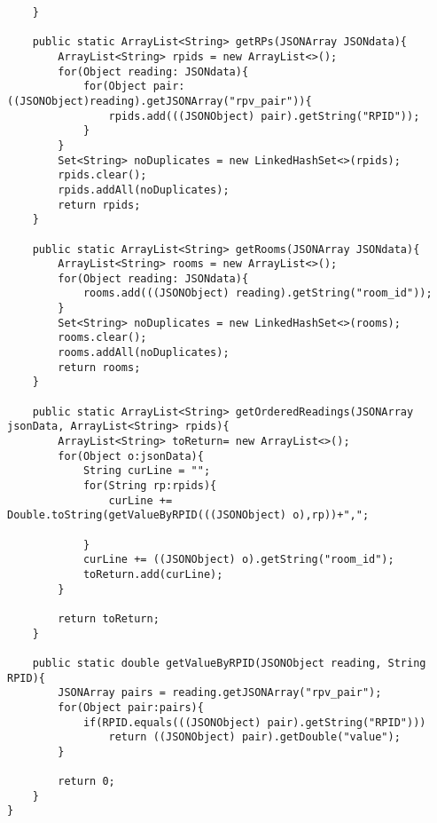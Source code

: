 \begin{lstlisting}
    }

    public static ArrayList<String> getRPs(JSONArray JSONdata){
        ArrayList<String> rpids = new ArrayList<>();
        for(Object reading: JSONdata){
            for(Object pair: ((JSONObject)reading).getJSONArray("rpv_pair")){
                rpids.add(((JSONObject) pair).getString("RPID"));
            }
        }
        Set<String> noDuplicates = new LinkedHashSet<>(rpids);
        rpids.clear();
        rpids.addAll(noDuplicates);
        return rpids;
    }

    public static ArrayList<String> getRooms(JSONArray JSONdata){
        ArrayList<String> rooms = new ArrayList<>();
        for(Object reading: JSONdata){
            rooms.add(((JSONObject) reading).getString("room_id"));
        }
        Set<String> noDuplicates = new LinkedHashSet<>(rooms);
        rooms.clear();
        rooms.addAll(noDuplicates);
        return rooms;
    }

    public static ArrayList<String> getOrderedReadings(JSONArray jsonData, ArrayList<String> rpids){
        ArrayList<String> toReturn= new ArrayList<>();
        for(Object o:jsonData){
            String curLine = "";
            for(String rp:rpids){
                curLine += Double.toString(getValueByRPID(((JSONObject) o),rp))+",";

            }
            curLine += ((JSONObject) o).getString("room_id");
            toReturn.add(curLine);
        }

        return toReturn;
    }

    public static double getValueByRPID(JSONObject reading, String RPID){
        JSONArray pairs = reading.getJSONArray("rpv_pair");
        for(Object pair:pairs){
            if(RPID.equals(((JSONObject) pair).getString("RPID")))
                return ((JSONObject) pair).getDouble("value");
        }

        return 0;
    }
}
\end{lstlisting}
\newpage
